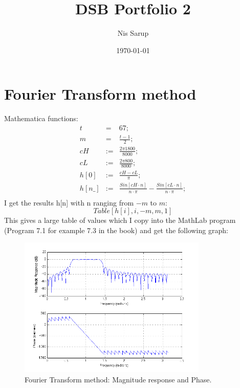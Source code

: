 \documentclass[a4wide,10pt]{article}
\begin{document}
\title{DSB Portfolio 2}
\author{Nis Sarup}
\date{\today}
\maketitle

\newpage

	\section{Fourier Transform method} %
	\label{sec:fourier_transform_method}
		Mathematica functions:
		\begin{eqnarray}
			t &=& 67; \nonumber \\
			m &=& \frac{t-1}{2}; \nonumber \\
			cH &:=& \frac{2\pi 1800}{8000}; \nonumber \\
			cL &:=& \frac{2\pi 800}{8000}; \nonumber \\
			h[0] &:=& \frac{cH-cL}{\pi}; \nonumber \\
			h[n\_] &:=& \frac{Sin[cH \cdot n]}{n\cdot \pi} - \frac{Sin[cL \cdot n]}{n\cdot \pi}; \nonumber \\
		\end{eqnarray}
		I get the results h[n] with n ranging from $-m$ to $m$:
		\begin{equation}
			Table[h[i], {i, -m, m, 1}] \nonumber
		\end{equation}
		This gives a large table of values which I copy into the MathLab program (Program 7.1 for example 7.3 in the book) and get the following graph:
		\begin{figure}[h]
			\centering
				\includegraphics[width=9cm]{images/opgave_1.png}
			\caption{Fourier Transform method: Magnitude response and Phase.}
			\label{fig:images_opgave_1}
		\end{figure}
	
\end{document}
